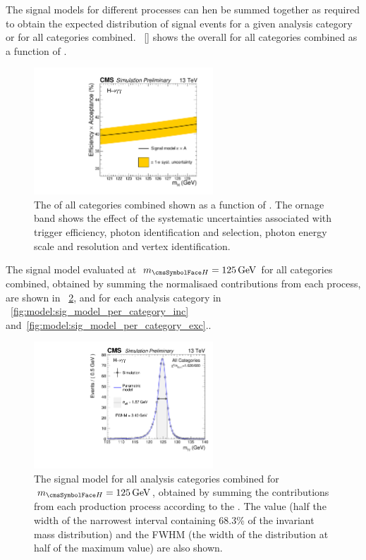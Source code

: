 The signal models for different processes can hen be summed together as required to obtain the expected \mgg distribution of signal events for a given analysis category or for all categories combined. \Fig~\ref{} shows the overall \effxacc for all categories combined as a function of \mH.

\begin{figure}[ht!]
\centering
\includegraphics[width=0.6\textwidth]{modellingFigures/effAcc_vs_mass.pdf} 
\caption{The \effxacc of all categories combined shown as a function of \mH. The ornage band shows the effect of the systematic uncertainties associated with trigger efficiency, photon identification and selection, photon energy scale and resolution and vertex identification.}

\label{fig:model:sig_effxacc}
\end{figure}

The signal model evaluated at $\mH=125\GeV$ for all categories combined, obtained by summing the normalisaed contributions from each process, are shown in \Fig~\ref{fig:model:sig_model_all}, and for each analysis category in \Fig\s~\ref{fig:model:sig_model_per_category_inc} and~\ref{fig:model:sig_model_per_category_exc}.. 
\begin{figure}[ht!]
\centering
\includegraphics[width=0.6\textwidth]{modellingFigures/DCBpG/all.pdf} 

\caption{The signal model for all analysis categories combined for $\mH=125\GeV$, obtained by summing the contributions from each production process according to the \effxacc. The \effSigma value (half the width of the narrowest interval containing 68.3\% of the invariant mass distribution) and the FWHM (the width of the distribution at half of the maximum value) are also shown. }

\label{fig:model:sig_model_all}
\end{figure}

